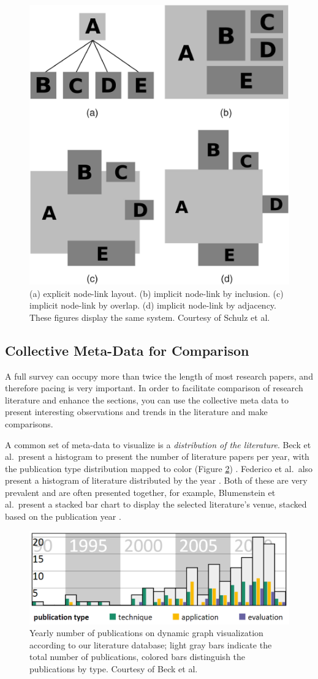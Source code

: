 \begin{figure}
\centering
\includegraphics[width=0.4\linewidth]{pictures/5473227-fig-2-source-hires.png}
\caption{(a) explicit node-link layout. (b) implicit node-link by inclusion. (c)  implicit node-link by overlap. (d)  implicit node-link by adjacency. These figures display the same system. Courtesy of Schulz et al. \cite{schulz2011design}} \label{fig:compare}
\end{figure}

\subsection{Collective Meta-Data for Comparison}
A full survey can occupy more than twice the length of most research papers, and therefore pacing is very important. In order to facilitate comparison of research literature and enhance the sections, you can use the collective meta data to present interesting observations and trends in the literature and make comparisons.

A common set of meta-data to visualize is a \textit{distribution of the literature}. Beck et al.\ present a histogram to present the number of literature papers per year, with the publication type distribution mapped to color (Figure \ref{fig:bar}) \cite{beck2014state}. Federico et al.\ also present a histogram of literature distributed by the year \cite{federico2016survey}. Both of these are very prevalent and are often presented together, for example, Blumenstein et al.\  present a stacked bar chart to display the selected literature's venue, stacked based on the publication year \cite{blumenstein2016evaluating}. 

\begin{figure}
\centering
\includegraphics[width=0.7\linewidth]{pictures/collectiveMetaDataExample.png}
\caption{Yearly number of publications on dynamic graph visualization according to our literature database; light gray bars indicate the total number of publications, colored bars distinguish the publications by type. Courtesy of Beck et al.\ \cite{beck2014state} } \label{fig:bar}
\end{figure}

